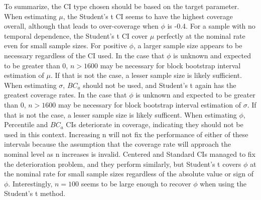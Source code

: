 \documentclass[12pt, letterpaper, titlepage]{article}
\begin{document}
To summarize, the CI type chosen should be based on the target parameter. 
When estimating $\mu$, the Student's t CI seems to have the highest coverage
overall, although that leads to over-coverage when $\phi$ is -0.4. For a
sample with no temporal dependence, the Student's t CI cover $\mu$ perfectly
at the nominal rate even for small sample sizes. For positive $\phi$, a larger
sample size appears to be necessary regardless of the CI used. In the case
that $\phi$ is unknown and expected to be greater than $0$, $n > 1600$ may be
necessary for block bootstrap interval estimation of $\mu$. If that is not the
case, a lesser sample size is likely sufficient. When estimating $\sigma$,
$BC_a$ should not be used, and Student's t again has the greatest coverage
rates. In the case that $\phi$ is unknown and expected to be greater than $0$,
$n > 1600$ may be necessary for block bootstrap interval estimation of
$\sigma$. If that is not the case, a lesser sample size is likely sufficent.
When estimating $\phi$, Percentile and $BC_a$ CIs 
deteriorate in coverage, indicating they should not be used in this context. 
Increasing n will not fix the performance of either of these intervals 
because the assumption that the coverage rate will approach the nominal level
as n increases is invalid. Centered and Standard CIs managed to fix the
deterioration problem, and they perform similarly, but Student's t covers
$\phi$ at the nominal rate for small sample sizes regardless of the absolute
value or sign of $\phi$. Interestingly, $n = 100$ seems to be large enough to
recover $\phi$ when using the Student's t method.
\end{document}
